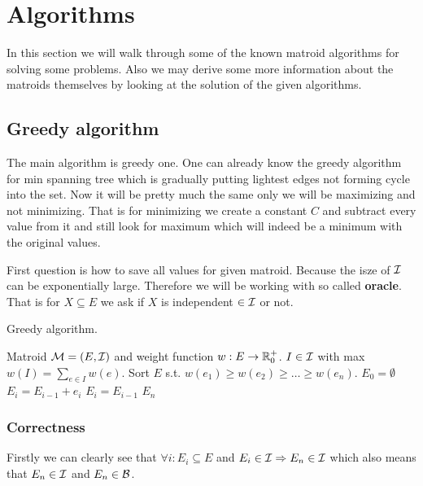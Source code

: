 \chapter{Algorithms}

In this section we will walk through some of the known matroid algorithms for solving some problems. Also we may derive some more information about the matroids themselves by looking at the solution of the given algorithms.

\section{Greedy algorithm}

The main algorithm is greedy one. One can already know the greedy algorithm for min spanning tree which is gradually putting lightest edges not forming cycle into the set. Now it will be pretty much the same only we will be maximizing and not minimizing. That is for minimizing we create a constant $C$ and subtract every value from it and still look for maximum which will indeed be a minimum with the original values.

First question is how to save all values for given matroid. Because the isze of $\mathcal{I}$ can be exponentially large. Therefore we will be working with so called \textbf{oracle}. That is for $X \subseteq E$ we ask if $X$ is independent $\in \mathcal{I}$ or not.

\begin{algorithm}[!ht]
	\caption{Greedy algorithm.}
	\begin{algorithmic}[1]
		\Require Matroid $\mathcal{M} = (E, \mathcal{I})$ and weight function $w : E \to \mathbb{R}_0^+$.
		\Ensure $I \in \mathcal{I}$ with max $w(I) = \sum_{e \in I} w(e)$.
		\State Sort $E$ s.t. $w(e_1) \geq w(e_2) \geq \dots \geq w(e_n)$.
		\State $E_0 = \emptyset$
				\State $E_{i} = E_{i-1} + e_i$
			\Else
				\State $E_i = E_{i-1}$
			\EndIf
		\EndFor
		\State \Return $E_n$
	\end{algorithmic}
\end{algorithm}

\subsection{Correctness}

Firstly we can clearly see that $\forall i:  E_i \subseteq E$ and $E_i \in \mathcal{I} \Rightarrow E_n \in \mathcal{I}$ which also means that $E_n \in \mathcal{I}$ and $E_n \in \mathcal{B}$.

